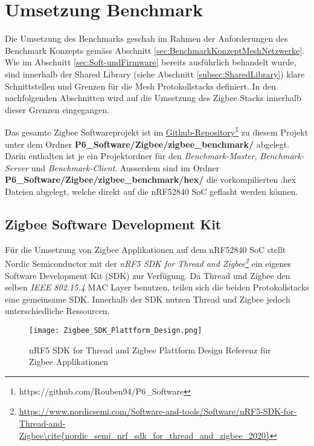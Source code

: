 \clearpage

\section{Umsetzung Benchmark}\label{sec:ZigbeeUmsetzungBenchmark}
Die Umsetzung des Benchmarks geschah im Rahmen der Anforderungen des Benchmark Konzepts gemäss Abschnitt \ref{sec:BenchmarkKonzeptMeshNetzwerke}.
Wie im Abschnitt \ref{sec:Soft-undFirmware} bereits ausführlich behandelt wurde, sind innerhalb der Shared Library (siehe Abschnitt \ref{subsec:SharedLibrary}) klare Schnittstellen und Grenzen für die Mesh Protokollstacks definiert.
In den nachfolgenden Abschnitten wird auf die Umsetzung des Zigbee Stacks innerhalb dieser Grenzen eingegangen.

Das gesamte Zigbee Softwareprojekt ist im \href{https://github.com/Rouben94/P6_Software}{Github-Repository\footnote{\url{https://github.com/Rouben94/P6_Software}\cite{anklin_bobst_horath_rouben94p6_software_nodate}}} zu diesem Projekt unter dem Ordner \textbf{P6\_Software/Zigbee/zigbee\_benchmark/} abgelegt.
Darin enthalten ist je ein Projektordner für den \textit{Benchmark-Master}, \textit{Benchmark-Server} und \textit{Benchmark-Client}.
Ausserdem sind im Ordner \textbf{P6\_Software/Zigbee/zigbee\_benchmark/hex/} die vorkompilierten .hex Dateien abgelegt, welche direkt auf die nRF52840 SoC geflasht werden können. 

\subsection{Zigbee Software Development Kit}\label{subsec:ZigbeeSoftwareDevelopmentKit}
Für die Umsetzung von Zigbee Applikationen auf dem nRF52840 SoC stellt Nordic Semiconductor mit der \textit{nRF5 SDK for Thread and Zigbee\footnote{\url{https://www.nordicsemi.com/Software-and-tools/Software/nRF5-SDK-for-Thread-and-Zigbee\cite{nordic_semi_nrf_sdk_for_thread_and_zigbee_2020}}}} ein eigenes Software Development Kit (SDK) zur Verfügung.
Da Thread und Zigbee den selben \textit{IEEE 802.15.4} MAC Layer benutzen, teilen sich die beiden Protokollstacks eine gemeinsame SDK.
Innerhalb der SDK nutzen Thread und Zigbee jedoch unterschiedliche Ressourcen.

\begin{figure}[h]
	\centering
	\texttt{[image: Zigbee\_SDK\_Plattform\_Design.png]}
	\caption{nRF5 SDK for Thread and Zigbee Plattform Design Referenz für Zigbee Applikationen \cite{nordic_semi_nrf_sdk_for_thread_and_zigbee_2020}}
	\label{fig:ZigbeePlattformDesign}
\end{figure}


